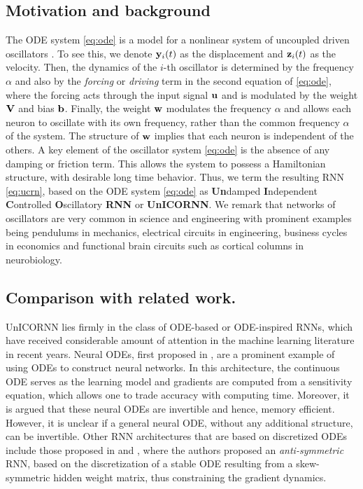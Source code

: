 \documentclass{article}
\newcommand{\by}{{\bf y}}
\newcommand{\bz}{{\bf z}}
\newcommand{\bw}{{\bf w}}
\newcommand{\bu}{{\bf u}}
\newcommand{\bb}{{\bf b}}
\newcommand{\bV}{{\bf V}}
\begin{document}
\subsection{Motivation and background}
The ODE system \eqref{eq:ode} is a model for a nonlinear system of uncoupled driven oscillators \cite{GHbook}. To see this, we denote $\by_i(t)$ as the displacement and $\bz_{i}(t)$ as the velocity. Then, the dynamics of the $i$-th oscillator is determined by the frequency $\alpha$ and also by the \emph{forcing} or \emph{driving} term in the second equation of \eqref{eq:ode}, where the forcing acts through the input signal $\bu$ and is modulated by the weight $\bV$ and bias $\bb$. Finally, the weight $\bw$ modulates the frequency $\alpha$ and allows each neuron to oscillate with its own frequency, rather than the common frequency $\alpha$ of the system. The structure of $\bw$ implies that each neuron is independent of the others. A key element of the oscillator system \eqref{eq:ode} is the absence of any damping or friction term. This allows the system to possess a Hamiltonian structure, with desirable long time behavior. Thus, we term the resulting RNN \eqref{eq:ucrn}, based on the ODE system \eqref{eq:ode} as \textbf{Un}damped \textbf{I}ndependent \textbf{C}ontrolled \textbf{O}scillatory \textbf{RNN} or \textbf{UnICORNN}. We remark that networks of oscillators are very common in science and engineering \cite{GHbook,stgz2} with prominent examples being pendulums in mechanics, electrical circuits in engineering, business cycles in economics and functional brain circuits such as cortical columns in neurobiology. 
\subsection{Comparison with related work.}
UnICORNN lies firmly in the class of ODE-based or ODE-inspired RNNs, which have received considerable amount of attention in the machine learning literature in recent years. Neural ODEs, first proposed in \cite{neuralODE}, are a prominent example of using ODEs to construct neural networks. In this architecture, the continuous ODE serves as the learning model and gradients are computed from a sensitivity equation, which allows one to trade accuracy with computing time. Moreover, it is argued that these neural ODEs are invertible and hence, memory efficient. However, it is unclear if a general neural ODE, without any additional structure, can be invertible. Other RNN architectures that are based on discretized ODEs include those proposed in \cite{E} and \cite{anti}, where the authors proposed an \emph{anti-symmetric} RNN, based on the discretization of a stable ODE resulting from a skew-symmetric hidden weight matrix, thus constraining the gradient dynamics.
\end{document}
